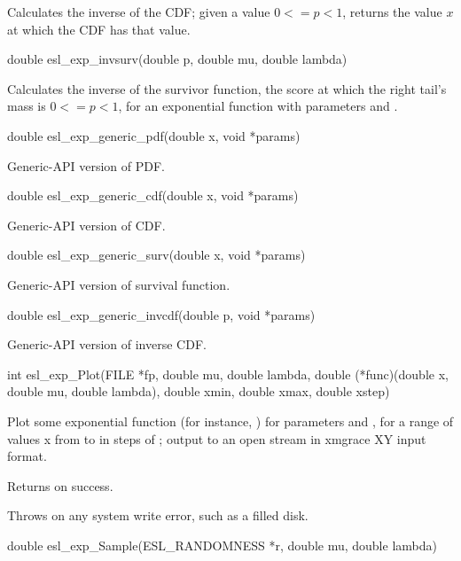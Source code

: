 \begin{sreapi}
Calculates the inverse of the CDF; given a  value
$0 <= p < 1$, returns the value $x$ at which the CDF
has that value.


\hypertarget{func:esl_exp_invsurv()}
{\item[double esl\_exp\_invsurv(double p, double mu, double lambda)]}

Calculates the inverse of the survivor function, the score
at which the right tail's mass is $0 <= p < 1$, for an
exponential function with parameters  and .


\hypertarget{func:esl_exp_generic_pdf()}
{\item[double esl\_exp\_generic\_pdf(double x, void *params)]}

Generic-API version of PDF.


\hypertarget{func:esl_exp_generic_cdf()}
{\item[double esl\_exp\_generic\_cdf(double x, void *params)]}

Generic-API version of CDF.


\hypertarget{func:esl_exp_generic_surv()}
{\item[double esl\_exp\_generic\_surv(double x, void *params)]}

Generic-API version of survival function.


\hypertarget{func:esl_exp_generic_invcdf()}
{\item[double esl\_exp\_generic\_invcdf(double p, void *params)]}

Generic-API version of inverse CDF.


\hypertarget{func:esl_exp_Plot()}
{\item[int esl\_exp\_Plot(FILE *fp, double mu, double lambda, 
	     double (*func)(double x, double mu, double lambda), 
	     double xmin, double xmax, double xstep)]}

Plot some exponential function  (for instance,
) for parameters  and , for
a range of values x from  to  in steps of ;
output to an open stream  in xmgrace XY input format.

Returns  on success.

Throws  on any system write error, such as a filled disk.


\hypertarget{func:esl_exp_Sample()}
{\item[double esl\_exp\_Sample(ESL\_RANDOMNESS *r, double mu, double lambda)]}


\end{sreapi}
